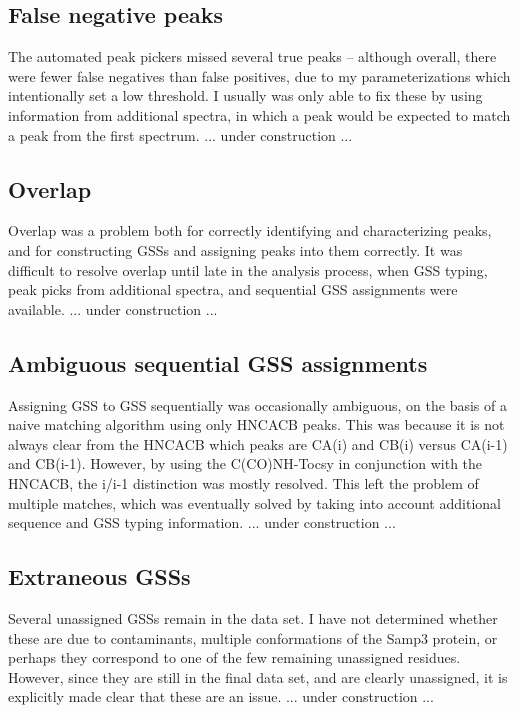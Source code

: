 \subsection{False negative peaks}
The automated peak pickers missed several true peaks -- although overall,
there were fewer false negatives than false positives, due to my parameterizations
which intentionally set a low threshold.  I usually was only able to fix
these by using information from additional spectra, in which a peak would
be expected to match a peak from the first spectrum.
... under construction ...

\subsection{Overlap}
Overlap was a problem both for correctly identifying and characterizing peaks,
and for constructing GSSs and assigning peaks into them correctly.
It was difficult to resolve overlap until late in the analysis process, when
GSS typing, peak picks from additional spectra, and sequential GSS assignments
were available.
... under construction ...

\subsection{Ambiguous sequential GSS assignments}
Assigning GSS to GSS sequentially was occasionally ambiguous, on the basis of
a naive matching algorithm using only HNCACB peaks.  This was because it is
not always clear from the HNCACB which peaks are CA(i) and CB(i) versus CA(i-1)
and CB(i-1).  However, by using the C(CO)NH-Tocsy in conjunction with the
HNCACB, the i/i-1 distinction was mostly resolved.  This left the problem of
multiple matches, which was eventually solved by taking into account additional
sequence and GSS typing information.
... under construction ...

\subsection{Extraneous GSSs}
Several unassigned GSSs remain in the data set.  I have not determined whether
these are due to contaminants, multiple conformations of the Samp3 protein,
or perhaps they correspond to one of the few remaining unassigned residues.
However, since they are still in the final data set, and are clearly unassigned,
it is explicitly made clear that these are an issue.
... under construction ...


